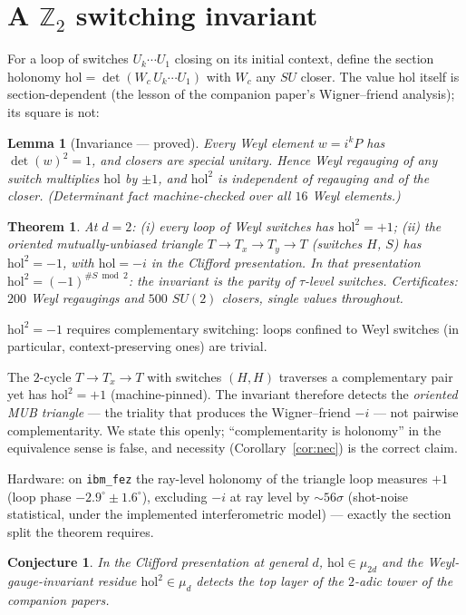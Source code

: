 \documentclass[11pt]{article}
\newtheorem{theorem}{Theorem}\newtheorem{lemma}{Lemma}\newtheorem{conjecture}{Conjecture}
\begin{document}
\section{A $\mathbb Z_2$ switching invariant}\label{sec:inv}
For a loop of switches $U_k\cdots U_1$ closing on its initial context, define the
section holonomy $\mathrm{hol}=\det(W_c\,U_k\cdots U_1)$ with $W_c$ any $SU$ closer.
The value $\mathrm{hol}$ itself is section-dependent (the lesson of the companion
paper's Wigner--friend analysis); its square is not:
\begin{lemma}[Invariance --- proved]\label{lem:inv}
Every Weyl element $w=i^kP$ has $\det(w)^2=1$, and closers are special unitary. Hence
Weyl regauging of any switch multiplies $\mathrm{hol}$ by $\pm1$, and
$\mathrm{hol}^2$ is independent of regauging and of the closer.
(Determinant fact machine-checked over all $16$ Weyl elements.)
\end{lemma}
\begin{theorem}\label{thm:inv}
At $d=2$: (i) every loop of Weyl switches has $\mathrm{hol}^2=+1$;
(ii) the oriented mutually-unbiased triangle $T\to T_x\to T_y\to T$ (switches $H$, $S$)
has $\mathrm{hol}^2=-1$, with $\mathrm{hol}=-i$ in the Clifford presentation. In that
presentation $\mathrm{hol}^2=(-1)^{\#S\bmod 2}$: the invariant is the parity of
$\tau$-level switches. Certificates: $200$ Weyl regaugings and $500$ $SU(2)$ closers,
single values throughout.
\end{theorem}
\begin{corollary}\label{cor:nec}
$\mathrm{hol}^2=-1$ requires complementary switching: loops confined to Weyl switches
(in particular, context-preserving ones) are trivial.
\end{corollary}
\begin{remark}
The $2$-cycle $T\to T_x\to T$ with switches $(H,H)$ traverses a complementary pair yet
has $\mathrm{hol}^2=+1$ (machine-pinned). The invariant therefore detects the
\emph{oriented MUB triangle} --- the triality that produces the Wigner--friend $-i$ ---
not pairwise complementarity. We state this openly; ``complementarity is holonomy'' in
the equivalence sense is false, and necessity (Corollary~\ref{cor:nec}) is the correct
claim.
\end{remark}
Hardware: on \texttt{ibm\_fez} the ray-level holonomy of the triangle loop measures
$+1$ (loop phase $-2.9^\circ\pm1.6^\circ$), excluding $-i$ at ray level by
${\sim}56\sigma$ (shot-noise statistical, under the implemented interferometric model) --- exactly the
section split the theorem requires.
\begin{conjecture}
In the Clifford presentation at general $d$, $\mathrm{hol}\in\mu_{2d}$ and the
Weyl-gauge-invariant residue $\mathrm{hol}^2\in\mu_d$ detects the top layer of the
$2$-adic tower of the companion papers.
\end{conjecture}
\end{document}
